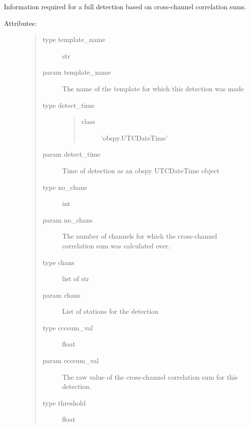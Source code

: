 \documentclass[a4paper,10pt,english]{sphinxmanual}
\begin{document}
\begin{fulllineitems}
\label{modules:match_filter.DETECTION}
Information required for a full detection based on cross-channel
correlation sums.
\begin{description}
\item[{Attributes:}] \leavevmode\begin{quote}\begin{description}
\item[{type template\_name}] \leavevmode
str

\item[{param template\_name}] \leavevmode
The name of the template for which this detection        was made

\item[{type detect\_time}] \leavevmode\begin{quote}\begin{description}
\item[{class}] \leavevmode
`obspy.UTCDateTime'

\end{description}\end{quote}

\item[{param detect\_time}] \leavevmode
Time of detection as an obspy UTCDateTime object

\item[{type no\_chans}] \leavevmode
int

\item[{param no\_chans}] \leavevmode
The number of channels for which the cross-channel        correlation sum was calculated over.

\item[{type chans}] \leavevmode
list of str

\item[{param chans}] \leavevmode
List of stations for the detection

\item[{type cccsum\_val}] \leavevmode
float

\item[{param cccsum\_val}] \leavevmode
The raw value of the cross-channel correlation sum        for this detection.

\item[{type threshold}] \leavevmode
float


\end{description}
\end{quote}
\end{description}
\end{fulllineitems}
\end{document}
